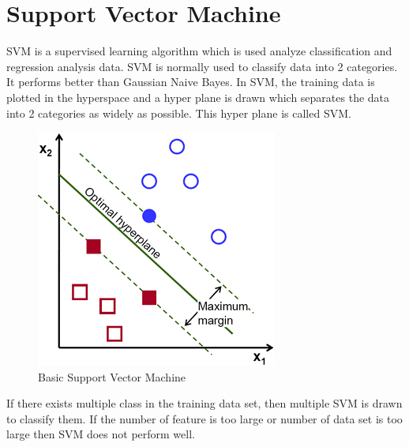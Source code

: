 \documentclass{standalone}
\begin{document}
\section{Support Vector Machine}

SVM is a supervised learning algorithm which is used analyze classification and regression analysis data. SVM is normally used to classify data into 2 categories. It performs better than Gaussian Naive Bayes. In SVM, the training data is plotted in the hyperspace and a hyper plane is drawn which separates the data into 2 categories as widely as possible. This hyper plane is called SVM.

\begin{figure}[h]
				\centering
				\includegraphics[scale=1.5]{./img/svm}
				\caption{Basic Support Vector Machine} \label{fig:mapComp}
\end{figure}

If there exists multiple class in the training data set, then multiple SVM is drawn to classify them. 
If the number of feature is too large or number of data set is too large then SVM does not perform well. 
\end{document}
